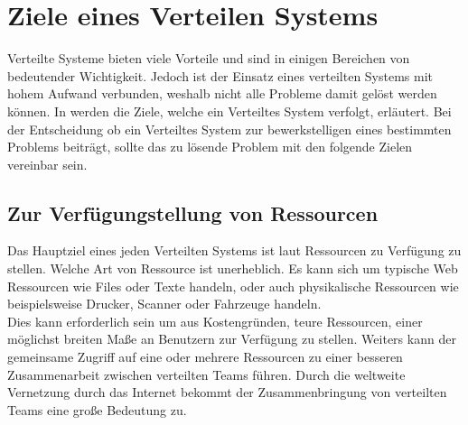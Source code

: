 \section{Ziele eines Verteilen Systems}\label{sec:distributedSystems:goales}
Verteilte Systeme bieten viele Vorteile und sind in einigen Bereichen von bedeutender Wichtigkeit. Jedoch ist der Einsatz eines verteilten Systems mit hohem Aufwand verbunden, weshalb nicht alle Probleme damit gelöst werden können. In \cite{tanenbaum2007distributed} werden die Ziele, welche ein Verteiltes System verfolgt, erläutert. Bei der Entscheidung ob ein Verteiltes System zur bewerkstelligen eines bestimmten Problems beiträgt, sollte das zu lösende Problem mit den folgende Zielen vereinbar sein.
% 
% 
% 

\subsection{Zur Verfügungstellung von Ressourcen}\label{sec:distributedSystems:goales:resourceAccess} Das Hauptziel eines jeden Verteilten Systems ist  laut \cite{tanenbaum2007distributed} Ressourcen zu Verfügung zu stellen. Welche Art von Ressource ist unerheblich. Es kann sich um typische Web Ressourcen wie Files oder Texte handeln, oder auch physikalische Ressourcen wie beispielsweise Drucker, Scanner oder Fahrzeuge handeln.\\
Dies kann erforderlich sein um aus Kostengründen, teure Ressourcen, einer möglichst breiten Maße an Benutzern zur Verfügung zu stellen. Weiters kann der gemeinsame Zugriff auf eine oder mehrere Ressourcen zu einer besseren Zusammenarbeit zwischen verteilten Teams führen. Durch die weltweite Vernetzung durch das Internet bekommt der Zusammenbringung von verteilten Teams eine große Bedeutung zu. 
% 
% 
